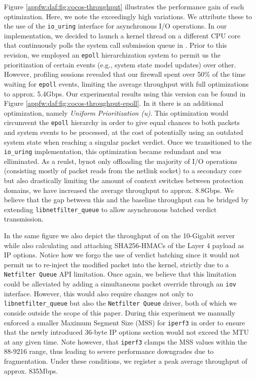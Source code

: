 

Figure \ref{appfw:daf:fig:cocos-throughput} illustrates the performance gain of each optimization. Here, we note the exceedingly high variations. We attribute these to the use of the \texttt{io\_uring} interface for asynchronous I/O operations. In our implementation, we decided to launch a kernel thread on a different CPU core that continuously polls the system call submission queue in \daf{}. Prior to this revision, we employed an \texttt{epoll} hierarchization system to permit us the prioritization of certain events (e.g., system state model updates) over other. However, profiling sessions revealed that our firewall spent over 50\% of the time waiting for \texttt{epoll} events, limiting the average throughput with full optimizations to approx. 5.4Gbps. Our experimental results using this version can be found in Figure \ref{appfw:daf:fig:cocos-throughput-epoll}. In it there is an additional optimization, namely \textit{Uniform Prioritization (u)}. This optimization would circumvent the \texttt{epoll} hierarchy in order to give equal chances to both packets and system events to be processed, at the cost of potentially using an outdated system state when reaching a singular packet verdict. Once we transitioned to the \texttt{io\_uring} implementation, this optimization became redundant and was elliminated. As a reulst, bynot only offloading the majority of I/O operations (consisting mostly of packet reads from the netlink socket) to a secondary core but also drastically limiting the amount of context switches between protection domains, we have increased the average throughput to approx. 8.8Gbps. We believe that the gap between this and the baseline throughput can be bridged by extending \texttt{libnetfilter\_queue} to allow asynchronous batched verdict transmission.



In the same figure we also depict the throughput of \daf{} on the 10-Gigabit server while also calculating and attaching SHA256-HMACs of the Layer 4 payload as IP options. Notice how we forgo the use of verdict batching since it would not permit us to re-inject the modified packet into the kernel, strictly due to a \texttt{Netfilter Queue} API limitation. Once again, we believe that this limitation could be alleviated by adding a simultaneous packet override through an \texttt{iov} interface. However, this would also require changes not only to \texttt{libnetfilter\_queue} but also the \texttt{Netfilter Queue} driver, both of which we conside outside the scope of this paper. During this experiment we manually enforced a smaller Maximum Segment Size (MSS) for \texttt{iperf3} in order to ensure that the newly introduced 36-byte IP options section would not exceed the MTU at any given time. Note however, that \texttt{iperf3} clamps the MSS values within the 88-9216 range, thus leading to severe performance downgrades due to fragmentation. Under these conditions, we register a peak average throughput of approx. 835Mbps.

